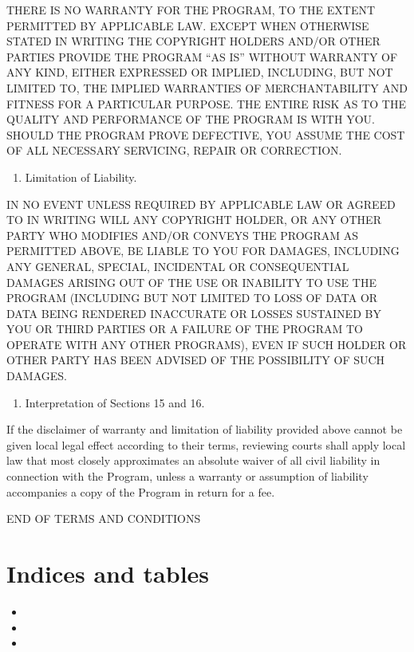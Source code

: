 \documentclass[letterpaper,10pt,english]{sphinxmanual}
\begin{document}
THERE IS NO WARRANTY FOR THE PROGRAM, TO THE EXTENT PERMITTED BY
APPLICABLE LAW.  EXCEPT WHEN OTHERWISE STATED IN WRITING THE COPYRIGHT
HOLDERS AND/OR OTHER PARTIES PROVIDE THE PROGRAM “AS IS” WITHOUT WARRANTY
OF ANY KIND, EITHER EXPRESSED OR IMPLIED, INCLUDING, BUT NOT LIMITED TO,
THE IMPLIED WARRANTIES OF MERCHANTABILITY AND FITNESS FOR A PARTICULAR
PURPOSE.  THE ENTIRE RISK AS TO THE QUALITY AND PERFORMANCE OF THE PROGRAM
IS WITH YOU.  SHOULD THE PROGRAM PROVE DEFECTIVE, YOU ASSUME THE COST OF
ALL NECESSARY SERVICING, REPAIR OR CORRECTION.
\begin{enumerate}
%
\setcounter{enumi}{15}
\item {} 
Limitation of Liability.

\end{enumerate}

IN NO EVENT UNLESS REQUIRED BY APPLICABLE LAW OR AGREED TO IN WRITING
WILL ANY COPYRIGHT HOLDER, OR ANY OTHER PARTY WHO MODIFIES AND/OR CONVEYS
THE PROGRAM AS PERMITTED ABOVE, BE LIABLE TO YOU FOR DAMAGES, INCLUDING ANY
GENERAL, SPECIAL, INCIDENTAL OR CONSEQUENTIAL DAMAGES ARISING OUT OF THE
USE OR INABILITY TO USE THE PROGRAM (INCLUDING BUT NOT LIMITED TO LOSS OF
DATA OR DATA BEING RENDERED INACCURATE OR LOSSES SUSTAINED BY YOU OR THIRD
PARTIES OR A FAILURE OF THE PROGRAM TO OPERATE WITH ANY OTHER PROGRAMS),
EVEN IF SUCH HOLDER OR OTHER PARTY HAS BEEN ADVISED OF THE POSSIBILITY OF
SUCH DAMAGES.
\begin{enumerate}
%
\setcounter{enumi}{16}
\item {} 
Interpretation of Sections 15 and 16.

\end{enumerate}

If the disclaimer of warranty and limitation of liability provided
above cannot be given local legal effect according to their terms,
reviewing courts shall apply local law that most closely approximates
an absolute waiver of all civil liability in connection with the
Program, unless a warranty or assumption of liability accompanies a
copy of the Program in return for a fee.

END OF TERMS AND CONDITIONS


\chapter{Indices and tables}
\label{\detokenize{index:indices-and-tables}}\begin{itemize}
\item {} 

\item {} 

\item {} 

\end{itemize}



\renewcommand{\indexname}{Index}
\printindex
\end{document}
